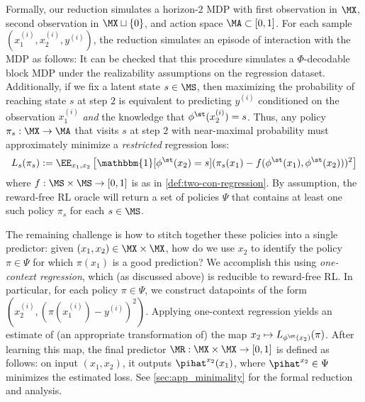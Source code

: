 Formally, our reduction simulates a horizon-$2$ MDP with first observation in $\MX$, second observation in $\MX\sqcup\{0\}$, and action space $\MA \subset [0,1]$. For each sample $(x_1^{(i)},x_2^{(i)},y^{(i)})$, the reduction simulates an episode of interaction with the MDP as follows:
It can be checked that this procedure simulates a $\Phi$-decodable block MDP under the realizability assumptions on the regression dataset. Additionally, if we fix a latent state $s \in \MS$, then maximizing the probability of reaching state $s$ at step $2$ is equivalent to predicting $y^{(i)}$ conditioned on the observation $x_1^{(i)}$ \emph{and} the knowledge that $\phi^\st(x_2^{(i)}) = s$. Thus, any policy $\pi_s: \MX \to \MA$ that visits $s$ at step $2$ with near-maximal probability must approximately minimize a \emph{restricted} regression loss:
\[L_s(\pi_s) := \EE_{x_1,x_2} \left[\mathbbm{1}[\phi^\st(x_2) = s] (\pi_s(x_1) - f(\phi^\st(x_1),\phi^\st(x_2)))^2\right]\]
where $f: \MS\times\MS\to[0,1]$ is as in \cref{def:two-con-regression}. By assumption, the reward-free RL oracle will return a set of policies $\Psi$ that contains at least one such policy $\pi_s$ for each $s \in \MS$. 

The remaining challenge is how to stitch together these policies into a single predictor: given $(x_1,x_2) \in \MX\times\MX$, how do we use $x_2$ to identify the policy $\pi \in \Psi$ for which $\pi(x_1)$ is a good prediction? We accomplish this using \emph{one-context regression}, which (as discussed above) is reducible to reward-free RL. In particular, for each policy $\pi \in \Psi$, we construct datapoints of the form $(x_2^{(i)}, (\pi(x_1^{(i)}) - y^{(i)})^2)$. Applying one-context regression yields an estimate of (an appropriate transformation of) the map $x_2 \mapsto L_{\phi^\st(x_2)}(\pi)$. After learning this map, the final predictor $\MR:\MX\times\MX\to[0,1]$ is defined as follows: on input $(x_1,x_2)$, it outputs $\pihat^{x_2}(x_1)$, where $\pihat^{x_2}\in\Psi$ minimizes the estimated loss. See \cref{sec:app_minimality} for the formal reduction and analysis.

